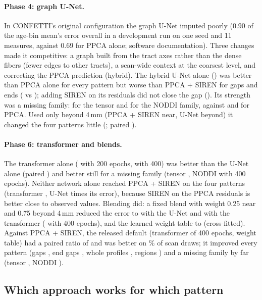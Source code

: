 \documentclass[11pt]{article}
\begin{document}
\paragraph{Phase 4: graph U-Net.} In CONFETTI's original configuration the graph U-Net imputed poorly (0.90 of the
age-bin mean's error overall in a development run on one seed and 11 measures, against 0.69 for PPCA alone; software
documentation). Three changes made it competitive: a graph built from the tract axes rather than the
dense fibers (fewer edges to other tracts), a scan-wide context at the coarsest level, and correcting the PPCA
prediction (hybrid). The hybrid U-Net alone (\rUnet{}) was better than PPCA alone for every pattern but worse than
PPCA + SIREN for gaps and ends (\rUnetGap{} vs \rDefaultGap{}); adding SIREN on its residuals did not close the gap
(\rUnetSiren{}). Its strength was a missing family: \rUnetWdti{} for the tensor and \rUnetWnoddi{} for the NODDI
family, against \rPpcaWdti{} and \rPpcaWnoddi{} for PPCA. Used only beyond 4\,mm (PPCA + SIREN near, U-Net beyond)
it changed the four patterns little (\rUnetBeyond{}; paired \cFRatio{}).

\paragraph{Phase 6: transformer and blends.} The transformer alone (\rTfTwo{} with 200 epochs, \rTfFour{} with 400)
was better than the U-Net alone (paired \cIRatio{}) and better still for a missing family (tensor \rTfFourWdti{},
NODDI \rTfFourWnoddi{} with 400 epochs). Neither network alone reached PPCA + SIREN on the four patterns (transformer
\cHRatio{}, U-Net \cERatio{} times its error), because SIREN on the PPCA residuals is better close to observed values.
Blending did: a fixed blend with weight 0.25 near and 0.75 beyond 4\,mm reduced the error to \rUnetBlend{} with the
U-Net and \rTfBlend{} with the transformer (\rTfBlendFour{} with 400 epochs), and the learned weight table to
\rFinal{} (cross-fitted). Against PPCA + SIREN, the released default (transformer of 400 epochs, weight table) had a
paired ratio of \cORatio{} and was better on \cOBetter\% of scan draws; it improved every pattern (gaps
\rFinalGap{}, end gaps \rFinalEnd{}, whole profiles \rFinalWhole{}, regions \rFinalRegion{}) and a missing family by
far (tensor \rFinalWdti{}, NODDI \rFinalWnoddi{}).

\subsection{Which approach works for which pattern}
\end{document}
